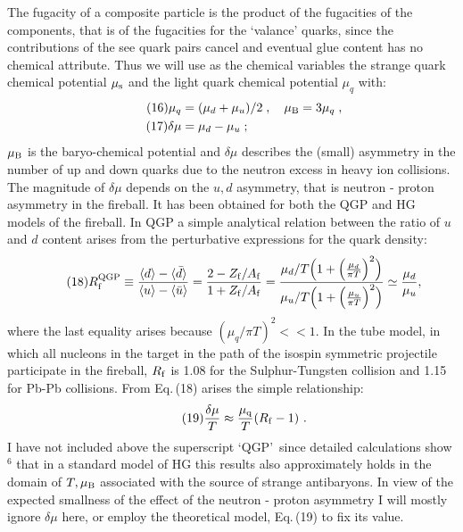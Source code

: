\begin{mdframed}[linecolor=gray,roundcorner=12pt,backgroundcolor=Dandelion!15,linewidth=1pt,leftmargin=0cm,rightmargin=0cm,topline=true,bottomline=true,skipabove=12pt]
The fugacity of a composite particle is the product of the fugacities of
the components, that is of the fugacities for the `valance' quarks, since
the contributions of the see quark pairs cancel and eventual glue content
has no chemical attribute. Thus we will use as the chemical variables the
strange quark chemical potential $\mu_{\rm s}$ and the light quark
chemical potential $\mu_q$ with:
\begin{align*}
\tag{16}\mu_q&=(\mu_d+\mu_u)/2 \;,\quad\mu_{\rm B}=3\mu_q \;,\\
\tag{17}\delta\mu&=\mu_d-\mu_u \;;
\end{align*}
$\mu_{\rm B}$ is the baryo-chemical potential and $\delta\mu$ describes
the (small) asymmetry in the number of up and down quarks due to the
neutron excess in heavy ion collisions. The magnitude of $\delta\mu$
depends on the $u,d$ asymmetry, that is neutron - proton asymmetry in the
fireball. It has been obtained for both the QGP and HG models of the
fireball. In QGP a simple analytical relation between the ratio of $u$
and $d$ content arises from the perturbative expressions for the quark
density:
\begin{equation}
\tag{18} R_{\rm f}^{\rm QGP}\equiv {{\langle d \rangle- \langle{\bar d} \rangle}
\over{ \langle u\rangle - \langle{\bar u} \rangle}}
={{2-{Z_{\rm f}/A_{\rm f}}}\over {1+{Z_{\rm f}/ A_{\rm f}}}}
={{\mu_d/T\Big(1+\Big({\mu_d\over{\pi T}}\Big)^2\Big)}\over
{\mu_u/T\Big(1+\Big({\mu_u\over{\pi T}}\Big)^2\Big)}}
\simeq{\mu_d\over\mu_u}, 
\end{equation}
where the last equality arises because $(\mu_q/\pi T)^2<<1$. In the tube
model, in which all nucleons in the target in the path of the isospin
symmetric projectile participate in the fireball, $R_{\rm f}$ is 1.08 for
the Sulphur-Tungsten collision and 1.15 for Pb-Pb collisions. From
Eq.\,(18) arises the simple relationship:
\begin{equation}
\tag{19} {\delta\mu\over T} \approx {\mu_{\rm q}\over T}(R_{\rm f}-1)\ .
\end{equation}
I have not included above the superscript \lq QGP\rq\ since detailed
calculations show$^6$ that in a standard model of HG this results also
approximately holds in the domain of $T,\mu_{\rm B}$ associated with the
source of strange antibaryons. In view of the expected smallness of the
effect of the neutron - proton asymmetry I will mostly ignore $\delta\mu$
here, or employ the theoretical model, Eq.\,(19) to fix its
value.
 

\end{mdframed}
